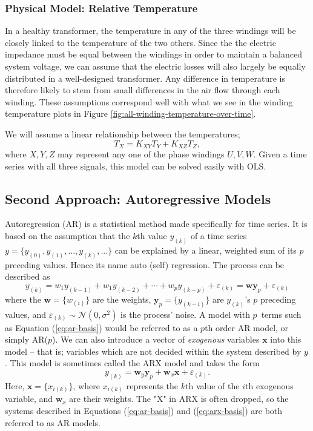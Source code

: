 \documentclass[]{article}
\begin{document}
\subsubsection{Physical Model: Relative Temperature} \label{sec:physical-model-relative}
In a healthy transformer, the temperature in any of the three windings will be closely linked to the temperature of the two others. Since the the electric impedance must be equal between the windings in order to maintain a balanced system voltage, we can assume that the electric losses will also largely be equally distributed in a well-designed transformer. Any difference in temperature is therefore likely to stem from small differences in the air flow through each winding. These assumptions correspond well with what we see in the winding temperature plots in Figure \ref{fig:all-winding-temperature-over-time}.

We will assume a linear relationship between the temperatures;
\begin{equation} \label{eq:physical-relative}
	T_X = K_{XY} T_Y + K_{XZ} T_Z,
\end{equation}
where $X,Y,Z$ may represent any one of the phase windings $U,V,W$. Given a time series with all three signals, this model can be solved easily with OLS.

\subsection{Second Approach: Autoregressive Models} \label{sec:autoregressive-model}
Autoregression (AR) is a statistical method made specifically for time series. It is based on the assumption that the $k$th value $y_{(k)}$ of a time series $y = \{y_{(0)}, y_{(1)}, ..., y_{(k)}, ...\}$ can be explained by a linear, weighted sum of its $p$ preceding values. Hence its name auto (self) regression. The process can be described as
\begin{equation} \label{eq:ar-basis}
	y_{(k)} = w_1 y_{(k-1)} + w_1 y_{(k-2)} + \cdots + w_p y_{(k-p)} + \varepsilon_{(k)} = \mathbf{w} \mathbf{y}_p + \varepsilon_{(k)}
\end{equation}
where the $\mathbf{w} = \{w_{(i)}\}$ are the weights, $\mathbf{y}_p = \{y_{(k-i)}\}$ are $y_{(k)}$'s $p$ preceding values, and $\varepsilon_{(k)} \sim \mathcal{N}(0,\sigma^2)$ is the process' noise. A model with $p$ terms such as Equation (\ref{eq:ar-basis}) would be referred to as a $p$th order AR model, or simply AR($p$). We can also introduce a vector of \textit{exogenous} variables $\mathbf{x}$ into this model -- that is; variables which are not decided within the system described by $y$. This model is sometimes called the ARX model and takes the form
\begin{equation} \label{eq:arx-basis}
	y_{(k)} = \mathbf{w}_y \mathbf{y}_p + \mathbf{w}_x \mathbf{x} + \varepsilon_{(k)}.
\end{equation}
Here, $\mathbf{x} = \{x_{i(k)}\}$, where $x_{i(k)}$ represents the $k$th value of the $i$th exogenous variable, and $\mathbf{w}_x$ are their weights. The "X" in ARX is often dropped, so the systems described in Equations (\ref{eq:ar-basis}) and (\ref{eq:arx-basis}) are both referred to as AR models. 
\end{document}
